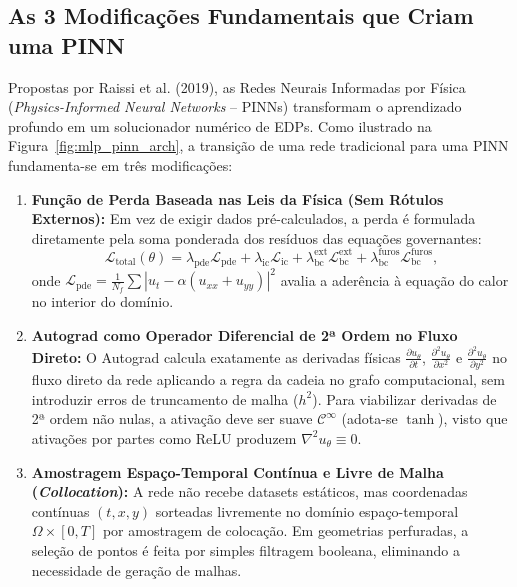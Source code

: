 \documentclass[11pt,a4paper]{article}
\begin{document}
\subsection{As 3 Modificações Fundamentais que Criam uma PINN}

Propostas por Raissi et al. (2019), as Redes Neurais Informadas por Física (\textit{Physics-Informed Neural Networks} -- PINNs) transformam o aprendizado profundo em um solucionador numérico de EDPs. Como ilustrado na Figura~\ref{fig:mlp_pinn_arch}, a transição de uma rede tradicional para uma PINN fundamenta-se em três modificações:

\begin{enumerate}[label=\textbf{\arabic*.}]
  \item \textbf{Função de Perda Baseada nas Leis da Física (Sem Rótulos Externos):} Em vez de exigir dados pré-calculados, a perda é formulada diretamente pela soma ponderada dos resíduos das equações governantes:
  \begin{equation}
  \mathcal{L}_{\text{total}}(\theta) = \lambda_{\text{pde}} \mathcal{L}_{\text{pde}} + \lambda_{\text{ic}} \mathcal{L}_{\text{ic}} + \lambda_{\text{bc}}^{\text{ext}} \mathcal{L}_{\text{bc}}^{\text{ext}} + \lambda_{\text{bc}}^{\text{furos}} \mathcal{L}_{\text{bc}}^{\text{furos}},
  \end{equation}
  onde $\mathcal{L}_{\text{pde}} = \frac{1}{N_f} \sum |u_t - \alpha(u_{xx} + u_{yy})|^2$ avalia a aderência à equação do calor no interior do domínio.

  \item \textbf{Autograd como Operador Diferencial de 2ª Ordem no Fluxo Direto:} O Autograd calcula exatamente as derivadas físicas $\frac{\partial u_\theta}{\partial t}$, $\frac{\partial^2 u_\theta}{\partial x^2}$ e $\frac{\partial^2 u_\theta}{\partial y^2}$ no fluxo direto da rede aplicando a regra da cadeia no grafo computacional, sem introduzir erros de truncamento de malha ($h^2$). Para viabilizar derivadas de 2ª ordem não nulas, a ativação deve ser suave $\mathcal{C}^\infty$ (adota-se $\tanh$), visto que ativações por partes como ReLU produzem $\nabla^2 u_\theta \equiv 0$.

  \item \textbf{Amostragem Espaço-Temporal Contínua e Livre de Malha (\textit{Collocation}):} A rede não recebe datasets estáticos, mas coordenadas contínuas $(t, x, y)$ sorteadas livremente no domínio espaço-temporal $\Omega \times [0, T]$ por amostragem de colocação. Em geometrias perfuradas, a seleção de pontos é feita por simples filtragem booleana, eliminando a necessidade de geração de malhas.
\end{enumerate}
\end{document}
